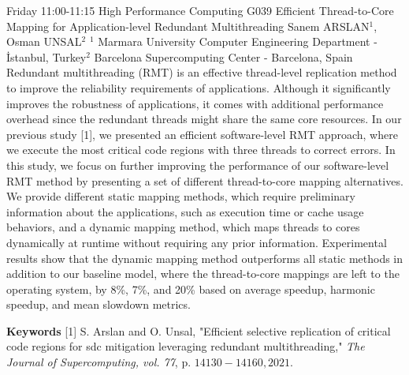 
    \begin{abstract_basarim}
    {Friday 11:00-11:15}
    {High Performance Computing}
    {G039}
    {Efficient Thread-to-Core Mapping for Application-level Redundant Multithreading}
    {%
    Sanem ARSLAN$^{1}$, Osman UNSAL$^{2}$}
    {%
    }
    {%
    $^1$ Marmara University Computer Engineering Department - İstanbul, Turkey\newline{}$^2$ Barcelona Supercomputing Center - Barcelona, Spain}
    Redundant multithreading (RMT) is an effective thread-level replication method to improve the reliability requirements of applications. Although it significantly improves the robustness of applications, it comes with additional performance overhead since the redundant threads might share the same core resources. In our previous study [1], we presented an efficient software-level RMT approach, where we execute the most critical code regions with three threads to correct errors. In this study, we focus on further improving the performance of our software-level RMT method by presenting a set of different thread-to-core mapping alternatives. We provide different static mapping methods, which require preliminary information about the applications, such as execution time or cache usage behaviors, and a dynamic mapping method, which maps threads to cores dynamically at runtime without requiring any prior information. Experimental results show that the dynamic mapping method outperforms all static methods in addition to our baseline model, where the thread-to-core mappings are left to the operating system, by 8\%, 7\%, and 20\% based on average speedup, harmonic speedup, and mean slowdown metrics. 
    
        \textbf{Keywords} \newline{}[1] S. Arslan and O. Unsal, "Efficient selective replication of critical code regions for sdc mitigation leveraging redundant multithreading," \textit{The Journal of Supercomputing, vol. 77}, p. $14130-14160,2021$.
    \end{abstract_basarim}
    